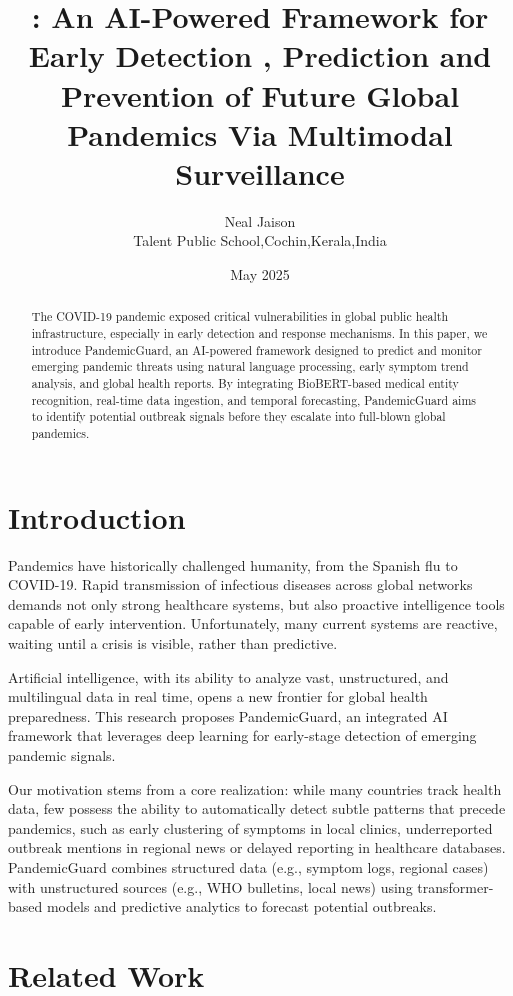 \documentclass[11pt]{article}
\title{\modelname: An AI-Powered Framework for Early Detection , Prediction and Prevention of Future Global Pandemics Via Multimodal Surveillance}
\author{Neal Jaison \\
Talent Public School,Cochin,Kerala,India}
\date{May 2025}
\newcommand{\modelname}{PandemicGuard\xspace}
\begin{document}
\maketitle

\begin{abstract}
The COVID-19 pandemic exposed critical vulnerabilities in global public health infrastructure, especially in early detection and response mechanisms. In this paper, we introduce \modelname, an AI-powered framework designed to predict and monitor emerging pandemic threats using natural language processing, early symptom trend analysis, and global health reports. By integrating BioBERT-based medical entity recognition, real-time data ingestion, and temporal forecasting, \modelname aims to identify 
potential outbreak signals before they escalate into full-blown global pandemics.

\end{abstract}

\section{Introduction}

Pandemics have historically challenged humanity, from the Spanish flu to COVID-19. Rapid transmission of infectious diseases across global networks demands not only strong healthcare systems, but also proactive intelligence tools capable of early intervention. Unfortunately, many current systems are reactive, waiting until a crisis is visible, rather than predictive.

Artificial intelligence, with its ability to analyze vast, unstructured, and multilingual data in real time, opens a new frontier for global health preparedness. This research proposes \modelname, an integrated AI framework that leverages deep learning for early-stage detection of emerging pandemic signals.

Our motivation stems from a core realization: while many countries track health data, few possess the ability to automatically detect subtle patterns that precede pandemics, such as early clustering of symptoms in local clinics, underreported outbreak mentions in regional news or delayed reporting in healthcare databases. \modelname    combines structured data (e.g., symptom logs, regional cases) with unstructured sources (e.g., WHO bulletins, local news) using transformer-based models and predictive analytics to forecast potential outbreaks.

\section{Related Work}
\end{document}
